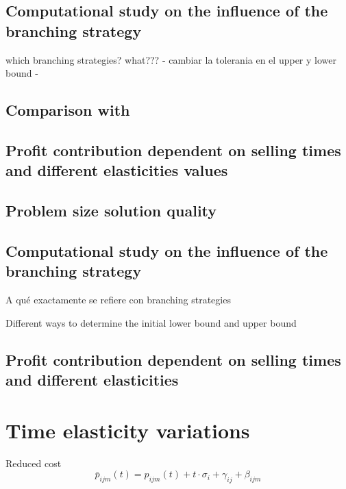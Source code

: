 \documentclass[12pt]{scrartcl}
\begin{document}
\subsection{Computational study on the inﬂuence of the branching strategy}

which branching strategies?
what???
- cambiar la tolerania en el upper y lower bound
-
\subsection{Comparison with \cite{Haase2014}}

\subsection{Proﬁt contribution dependent on selling times and different elasticities values}


\subsection{Problem size solution quality}


\subsection{Computational study on the inﬂuence of the branching strategy}

A qué exactamente se refiere con branching strategies


Different ways to determine the initial lower bound and upper bound



\subsection{Proﬁt contribution dependent on selling times and different elasticities}






\appendix
\section{Time elasticity variations}
\small
Reduced cost \\
\vspace{-2mm}
\begin{equation}
     \bar{p}_{ijm}(t)=p_{ijm}(t) + t \cdot \sigma_i + \gamma_{ij} + \beta_{ijm}
     \label{new_Red}
\end{equation}
\end{document}
